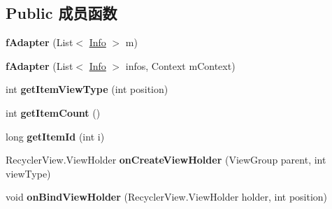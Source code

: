 \subsection*{Public 成员函数}
\begin{DoxyCompactItemize}
\item 
\mbox{\label{classcom_1_1example_1_1twitter_1_1f_adapter_a9540f9f1546eb7542622a1ef75fd63e4}} 
{\bfseries f\+Adapter} (List$<$ \mbox{\hyperlink{classcom_1_1example_1_1twitter_1_1_info}{Info}} $>$ m)
\item 
\mbox{\label{classcom_1_1example_1_1twitter_1_1f_adapter_acc72311c9415d93af1b64ee59e223c84}} 
{\bfseries f\+Adapter} (List$<$ \mbox{\hyperlink{classcom_1_1example_1_1twitter_1_1_info}{Info}} $>$ infos, Context m\+Context)
\item 
\mbox{\label{classcom_1_1example_1_1twitter_1_1f_adapter_a22e4907a4cb7418cab0d6a7108b214fe}} 
int {\bfseries get\+Item\+View\+Type} (int position)
\item 
\mbox{\label{classcom_1_1example_1_1twitter_1_1f_adapter_ab93fb7fc944d90d7198eff15dd0bcd82}} 
int {\bfseries get\+Item\+Count} ()
\item 
\mbox{\label{classcom_1_1example_1_1twitter_1_1f_adapter_a06154b0de6ca248d0790e0d7a42ec9c6}} 
long {\bfseries get\+Item\+Id} (int i)
\item 
\mbox{\label{classcom_1_1example_1_1twitter_1_1f_adapter_a7fda6eeb24b8047028012e96f0a5795b}} 
Recycler\+View.\+View\+Holder {\bfseries on\+Create\+View\+Holder} (View\+Group parent, int view\+Type)
\item 
\mbox{\label{classcom_1_1example_1_1twitter_1_1f_adapter_ac0120b9e8ef16bdf543a8d8e8172d26c}} 
void {\bfseries on\+Bind\+View\+Holder} (Recycler\+View.\+View\+Holder holder, int position)
\end{DoxyCompactItemize}
